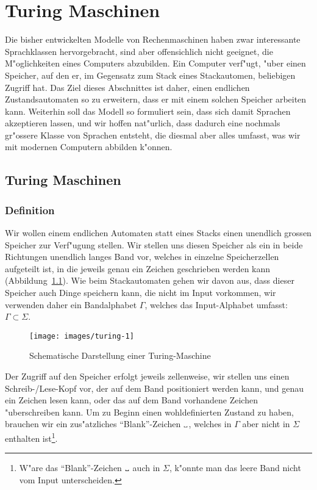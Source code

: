 %
%
%
\def\blank{\text{\textvisiblespace}}
\chapter{Turing Maschinen\label{chapter-turing}}
Die bisher entwickelten Modelle von Rechenmaschinen haben zwar
interessante Sprachklassen hervorgebracht, sind aber offensichlich nicht
geeignet, die M"oglichkeiten eines Computers abzubilden. Ein
Computer verf"ugt, "uber einen Speicher, auf den er, im Gegensatz zum
Stack eines Stackautomen, beliebigen Zugriff hat. Das Ziel dieses
Abschnittes ist daher, einen endlichen Zustandsautomaten so zu
erweitern, dass er mit einem solchen Speicher arbeiten kann.
Weiterhin soll das Modell so formuliert sein, dass sich damit
Sprachen akzeptieren lassen, und wir hoffen nat"urlich, dass dadurch
eine nochmals gr"ossere Klasse von Sprachen entsteht, die diesmal
aber alles umfasst, was wir mit modernen Computern abbilden k"onnen.

\section{Turing Maschinen}
\subsection{Definition}
Wir wollen einem endlichen Automaten statt eines Stacks einen unendlich
grossen Speicher zur Verf"ugung stellen. Wir stellen uns diesen
Speicher als ein in beide Richtungen unendlich langes Band vor,
welches in einzelne Speicherzellen aufgeteilt ist, in die jeweils
genau ein Zeichen geschrieben werden kann (Abbildung~\ref{turingfig}).
Wie beim Stackautomaten gehen
wir davon aus, dass dieser Speicher auch Dinge speichern kann, die nicht
im Input vorkommen, wir verwenden daher ein Bandalphabet $\Gamma$, welches
das Input-Alphabet umfasst: $\Gamma\subset \Sigma$.

\begin{figure}
\begin{center}
\texttt{[image: images/turing-1]}
\end{center}
\caption{Schematische Darstellung einer Turing-Maschine\label{turingfig}}
\end{figure}

Der Zugriff auf den Speicher erfolgt jeweils zellenweise, wir stellen
uns einen Schreib-/Lese-Kopf vor, der auf dem Band positioniert werden
kann, und genau ein Zeichen lesen kann, oder das auf dem Band vorhandene
Zeichen "uberschreiben kann. Um zu Beginn einen wohldefinierten Zustand
zu haben, brauchen wir ein zus"atzliches ``Blank''-Zeichen $\blank$,
welches in $\Gamma$ aber nicht in $\Sigma$ enthalten ist\footnote{W"are
das ``Blank''-Zeichen $\blank$ auch in $\Sigma$, k"onnte man das
leere Band nicht vom Input unterscheiden.}.

